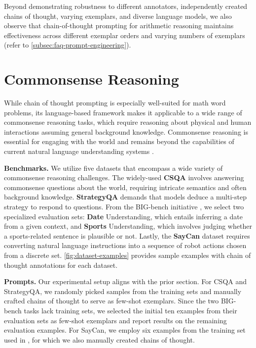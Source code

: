 Beyond demonstrating robustness to different annotators, independently created chains of thought, varying exemplars, and diverse language models, we also observe that chain-of-thought prompting for arithmetic reasoning maintains effectiveness across different exemplar orders and varying numbers of exemplars (refer to \cref{subsec:faq-prompt-engineering}).

\section{Commonsense Reasoning}\label{sec:commonsense-reasoning}

While chain of thought prompting is especially well-suited for math word problems, its language-based framework makes it applicable to a wide range of commonsense reasoning tasks, which require reasoning about physical and human interactions assuming general background knowledge. Commonsense reasoning is essential for engaging with the world and remains beyond the capabilities of current natural language understanding systems \citep{talmor2022commonsenseqa}.

\textbf{Benchmarks.}  
We utilize five datasets that encompass a wide variety of commonsense reasoning challenges. The widely-used \textbf{CSQA} \citep{talmor-etal-2019-commonsenseqa} involves answering commonsense questions about the world, requiring intricate semantics and often background knowledge. \textbf{StrategyQA} \citep{geva-etal-2021-aristotle} demands that models deduce a multi-step strategy to respond to questions. From the BIG-bench initiative \citep{bigbench}, we select two specialized evaluation sets: \textbf{Date} Understanding, which entails inferring a date from a given context, and \textbf{Sports} Understanding, which involves judging whether a sports-related sentence is plausible or not. Lastly, the \textbf{SayCan} dataset \citep{ahn2022can} requires converting natural language instructions into a sequence of robot actions chosen from a discrete set.  
\cref{fig:dataset-examples} provides sample examples with chain of thought annotations for each dataset.

\textbf{Prompts.}  
Our experimental setup aligns with the prior section. For CSQA and StrategyQA, we randomly picked samples from the training sets and manually crafted chains of thought to serve as few-shot exemplars. Since the two BIG-bench tasks lack training sets, we selected the initial ten examples from their evaluation sets as few-shot exemplars and report results on the remaining evaluation examples. For SayCan, we employ six examples from the training set used in \citet{ahn2022can}, for which we also manually created chains of thought.

